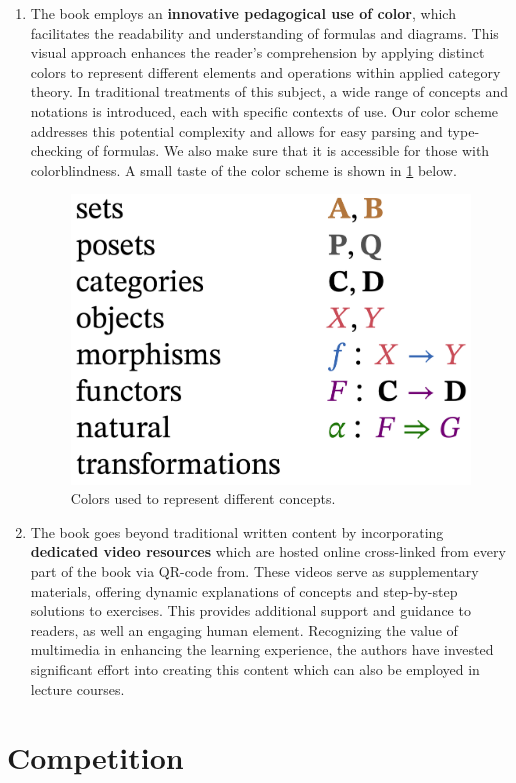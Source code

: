 \documentclass[10pt, article, one side]{memoir}
\begin{document}
\begin{enumerate}
        \item   The book employs an \textbf{innovative pedagogical use of color}, which facilitates the readability and understanding of formulas and diagrams.
              This visual approach enhances the reader's comprehension by applying distinct colors to represent different elements and operations within applied category theory.
              In traditional treatments of this subject, a wide range of concepts and notations is introduced, each with specific contexts of use.
              Our color scheme addresses this potential complexity and allows for easy parsing and type-checking of formulas.
              We also make sure that it is accessible for those with colorblindness.
              A small taste of the color scheme is shown in \cref{fig:use-colors} below.
              \begin{figure}[h]
                  \begin{center}
                      \includegraphics[width=0.3\linewidth]{pics/use_colors}
                  \end{center}
                  \caption{Colors used to represent different concepts. \label{fig:use-colors}}
              \end{figure}

        \item The book goes beyond traditional written content by incorporating \textbf{dedicated video resources} which are hosted online cross-linked from every part of the book via QR-code from.
              These videos serve as supplementary materials, offering dynamic explanations of concepts and step-by-step solutions to exercises.
              This provides additional support and guidance to readers, as well an engaging human element.
              Recognizing the value of multimedia in enhancing the learning experience, the authors have invested significant effort into creating this content which can also be employed in lecture courses.

    \end{enumerate}

    \section{Competition}
    \label{sec:competition}
\end{document}

